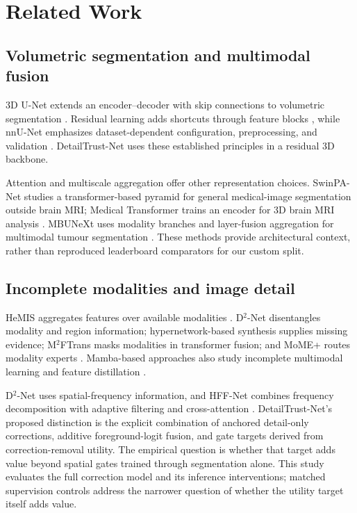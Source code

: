 \documentclass[conference]{IEEEtran}
\begin{document}
\section{Related Work}
\subsection{Volumetric segmentation and multimodal fusion}
3D U-Net extends an encoder--decoder with skip connections to volumetric segmentation \cite{cicek2016}. Residual learning adds shortcuts through feature blocks \cite{he2016resnet}, while nnU-Net emphasizes dataset-dependent configuration, preprocessing, and validation \cite{isensee2021}. DetailTrust-Net uses these established principles in a residual 3D backbone.

Attention and multiscale aggregation offer other representation choices. SwinPA-Net studies a transformer-based pyramid for general medical-image segmentation outside brain MRI; Medical Transformer trains an encoder for 3D brain MRI analysis \cite{du2024swinpa,jun2024medtrans}. MBUNeXt uses modality branches and layer-fusion aggregation for multimodal tumour segmentation \cite{liu2025mbunext}. These methods provide architectural context, rather than reproduced leaderboard comparators for our custom split.

\subsection{Incomplete modalities and image detail}
HeMIS aggregates features over available modalities \cite{havaei2016hemis}. D$^2$-Net disentangles modality and region information; hypernetwork-based synthesis supplies missing evidence; M$^2$FTrans masks modalities in transformer fusion; and MoME+ routes modality experts \cite{yang2022d2,yang2023hyper,shi2024m2f,zhang2025mome}. Mamba-based approaches also study incomplete multimodal learning and feature distillation \cite{zhang2026m2seg,kang2026mamba}.

D$^2$-Net uses spatial-frequency information, and HFF-Net combines frequency decomposition with adaptive filtering and cross-attention \cite{yang2022d2,shao2025hff}. DetailTrust-Net's proposed distinction is the explicit combination of anchored detail-only corrections, additive foreground-logit fusion, and gate targets derived from correction-removal utility. The empirical question is whether that target adds value beyond spatial gates trained through segmentation alone. This study evaluates the full correction model and its inference interventions; matched supervision controls address the narrower question of whether the utility target itself adds value.
\end{document}
